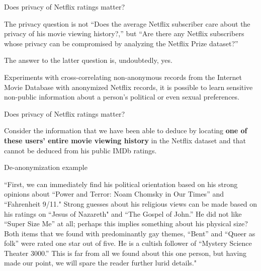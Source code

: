 \documentclass[12pt,aspectratio=169,handout]{beamer}
\begin{document}
\begin{frame}{Does privacy of Netflix ratings matter?}

The privacy question is not “Does the average Netflix subscriber care about the privacy of his movie viewing history?,” but “Are there any Netflix subscribers whose privacy can be compromised by analyzing the Netflix Prize dataset?”

The answer to the latter question is, undoubtedly, yes.

Experiments with cross-correlating non-anonymous records from the Internet Movie Database with anonymized Netflix records, it is possible to learn sensitive non-public information about a person’s political or even sexual preferences.



\end{frame}


\begin{frame}{Does privacy of Netflix ratings matter?}

Consider the information that we have been able to deduce by locating \textbf{one of these users’ entire movie viewing history} in the Netflix dataset and that cannot be deduced from his public IMDb ratings. 


\end{frame}

\begin{frame}{De-anonymization example}

``First, we can immediately find his political orientation based on his strong opinions about ``Power and Terror: Noam Chomsky in Our Times'' and ``Fahrenheit 9/11." Strong guesses about his religious views can be made based on his ratings on ``Jesus of Nazareth" and ``The Gospel of John.'' He did not like ``Super Size Me'' at all; perhaps this implies something about his physical size? Both items that we found with predominantly gay themes, ``Bent'' and ``Queer as folk'' were rated one star out of five. He is a cultish follower of ``Mystery Science Theater 3000.'' This is far from all we found about this one person, but having made our point, we will spare the reader further lurid details."


\end{frame}
\end{document}
